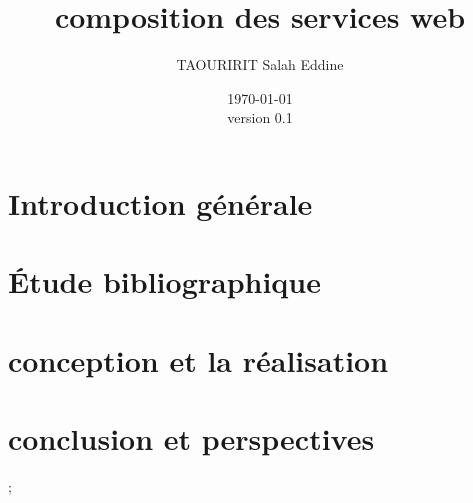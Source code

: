 \documentclass[a4paper, 11pt]{report}
\author{TAOURIRIT Salah Eddine}
\title{composition des services web}
\date{\today\\version 0.1}
\begin{document}
\maketitle 
\tableofcontents
{}  

\part{Introduction générale}

\part{Étude bibliographique}


\part{conception et la réalisation} 
\part{conclusion et perspectives}

;
\end{document}
